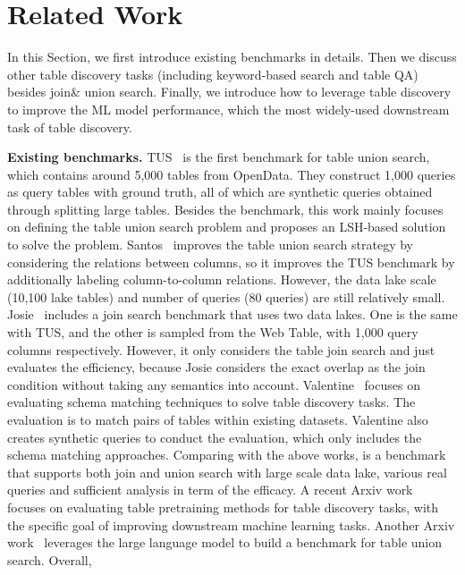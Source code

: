 \section{Related Work}
In this Section, we first introduce existing  benchmarks in details. Then we discuss other table discovery tasks  (including keyword-based search and table QA) besides join\& union search. Finally, we introduce how to leverage table discovery to improve the ML model performance, which the most widely-used downstream task of table discovery. 



\noindent \textbf{Existing benchmarks.} 
TUS~\cite{TUS} is the first benchmark for table union search, which contains around 5,000 tables from OpenData. They construct 1,000 queries  as query tables with ground truth, all of which are synthetic queries obtained through splitting large tables. Besides the benchmark, this work mainly focuses on defining the table union search problem and proposes an LSH-based  solution to solve the problem.
%
Santos~\cite{Santos} improves the table union search strategy by considering the relations between columns, so it improves the  TUS benchmark by additionally labeling column-to-column relations. However, the data lake scale (10,100  lake tables) and number of queries (80 queries) are still relatively small. 
%
Josie~\cite{Josie} includes a join search benchmark that uses two data lakes. One is the same with TUS, and the other is sampled from the Web Table, with 1,000 query columns respectively. However, it only considers the table join search and just evaluates the efficiency, because Josie  considers the exact overlap as the join condition without taking any semantics into account. 
%
Valentine~\cite{valentine} focuses on evaluating  schema matching techniques to solve table discovery tasks. The evaluation is to match pairs of tables within  existing datasets.   Valentine also creates synthetic queries to conduct the evaluation, which only includes the schema matching approaches.
%
Comparing with the above works, \sys is a benchmark that supports both join and union search with large scale data lake, various real queries and sufficient analysis in term of the efficacy.  
%
A recent Arxiv work~\cite{arxiv} focuses on evaluating table pretraining methods for table
 discovery tasks, with the specific goal of improving downstream machine learning tasks. 
%
Another Arxiv work~\cite{arxiv} leverages the large language model to build a benchmark for table union search.
%
Overall, \sys


